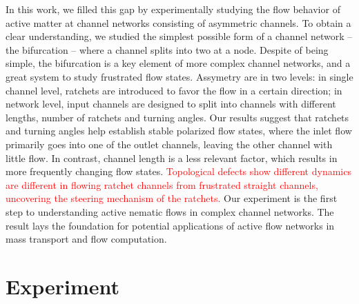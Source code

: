 \documentclass[%
10pt,
superscriptaddress,
twocolumn,
 amsmath,amssymb,
 aps,prx,
]{revtex4-2}
\begin{document}


In this work, we filled this gap by experimentally studying the flow behavior of active matter at channel networks consisting of asymmetric channels. 
To obtain a clear understanding, we studied the simplest possible form of a channel network -- the bifurcation -- where a channel splits into two at a node.
Despite of being simple, the bifurcation is a key element of more complex channel networks, and a great system to study frustrated flow states.
Assymetry are in two levels: in single channel level, ratchets are introduced to favor the flow in a certain direction; in network level, input channels are designed to split into channels with different lengths, number of ratchets and turning angles.
Our results suggest that ratchets and turning angles help establish stable polarized flow states, where the inlet flow primarily goes into one of the outlet channels, leaving the other channel with little flow.
In contrast, channel length is a less relevant factor, which results in more frequently changing flow states.
\textcolor{red}{Topological defects show different dynamics are different in flowing ratchet channels from frustrated straight channels, uncovering the steering mechanism of the ratchets.}
Our experiment is the first step to understanding active nematic flows in complex channel networks.
The result lays the foundation for potential applications of active flow networks in mass transport and flow computation. 

\section{Experiment}
\end{document}
